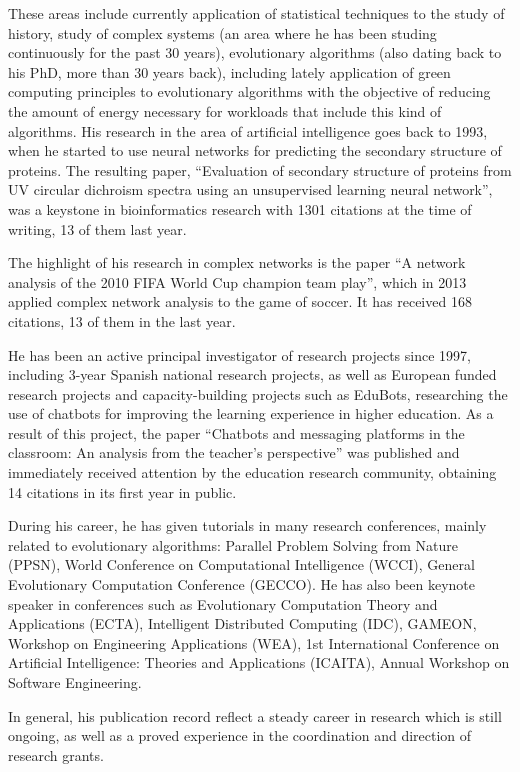 \documentclass[a4paper]{article}
\begin{document}
These areas include currently application of statistical techniques to the study of history, study of complex systems (an area where he has been studing continuously for the past 30 years), evolutionary algorithms (also dating back to his PhD, more than 30 years back), including lately application of green computing principles to evolutionary algorithms with the objective of reducing the amount of energy necessary for workloads that include this kind of algorithms. His research in the area of artificial intelligence goes back to 1993, when he started to use neural networks for predicting the secondary structure of proteins. The resulting paper, ``Evaluation of secondary structure of proteins from UV circular dichroism spectra using an unsupervised learning neural network'', was a keystone in bioinformatics research with 1301 citations at the time of writing, 13 of them last year.

The highlight of his research in complex networks is the paper ``A network analysis of the 2010 FIFA World Cup champion team play'', which in 2013 applied complex network analysis to the game of soccer. It has received 168 citations, 13 of them in the last year.

He has been an active principal investigator of research projects since 1997, including 3-year Spanish national research projects, as well as European funded research projects and capacity-building projects such as EduBots, researching the use of chatbots for improving the learning experience in higher education. As a result of this project, the paper ``Chatbots and messaging platforms in the classroom: An analysis from the teacher’s perspective'' was published and immediately received attention by the education research community, obtaining 14 citations in its first year in public.

During his career, he has given tutorials in many research conferences, mainly related to evolutionary algorithms: Parallel Problem Solving from Nature (PPSN), World Conference on Computational Intelligence (WCCI), General Evolutionary Computation Conference (GECCO). He has also been keynote speaker in conferences such as Evolutionary Computation Theory and Applications (ECTA), Intelligent Distributed Computing (IDC), GAMEON, Workshop on Engineering Applications (WEA), 1st International Conference on Artificial Intelligence: Theories and Applications (ICAITA), Annual Workshop on Software Engineering.

In general, his publication record reflect a steady career in research which is still ongoing, as well as a proved experience in the coordination and direction of research grants.
\end{document}
